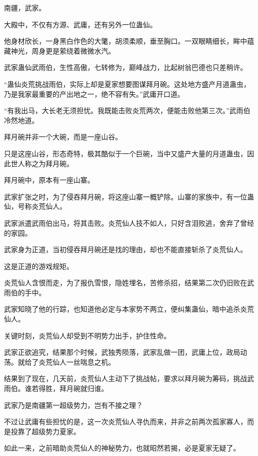 
\begin{this_body}



南疆，武家。

大殿中，不仅有方源、武庸，还有另外一位蛊仙。

他身材欣长，一身黑白作色的大氅，胡须柔顺，垂至胸口。一双眼睛细长，眸中蕴藏神光，周身更是萦绕着微微水汽。

武家蛊仙武雨伯，生性高傲，七转修为，巅峰战力，比起树翁巴德也只差稍许。

“蛊仙炎荒挑战雨伯，实际上却是夏家想要图谋拜月碗。这处地方盛产月道蛊虫，乃是我家最重要的产出地之一，绝不容有失。”武庸开口道。

“有我出马，大长老无须担忧。我既能击败炎荒两次，便能击败他第三次。”武雨伯冷然地道。

拜月碗并非一个大碗，而是一座山谷。

只是这座山谷，形态奇特，极其酷似于一个巨碗，当中又盛产大量的月道蛊虫，因此世人称之为拜月碗。

拜月碗中，原本有一座山寨。

武家扩张之时，为了侵吞拜月碗，将这座山寨一概铲除。山寨的家族中，有一位蛊仙，号称炎荒仙人。

武家派遣武雨伯出马，将其击败。炎荒仙人技不如人，只好含泪败逃，舍弃了曾经的家园。

武家身为正道，当初侵吞拜月碗还是找的理由，却也不能直接斩杀了炎荒仙人。

这是正道的游戏规矩。

炎荒仙人含恨而走，为了报仇雪恨，隐姓埋名，苦修杀招，结果第二次仍旧败在武雨伯的手中。

武家知晓了他的行踪，也知道他必定与本家势不两立，便纠集蛊仙，暗中追杀炎荒仙人。

关键时刻，炎荒仙人却受到不明势力出手，护住性命。

武家正欲追究，结果那个时候，武独秀陨落，武家乱做一团，武庸上位，政局动荡。就给了炎荒仙人一丝喘息之机。

结果到了现在，几天前，炎荒仙人主动下了挑战帖，要求以拜月碗为筹码，挑战武雨伯。谁若得胜，拜月碗就归谁。

武家乃是南疆第一超级势力，岂有不接之理？

不过让武庸有些担忧的是，这一次炎荒仙人寻仇而来，并非之前两次孤家寡人，而是投靠了超级势力夏家。

如此一来，之前暗助炎荒仙人的神秘势力，也就昭然若揭，必是夏家无疑了。


\end{this_body}
